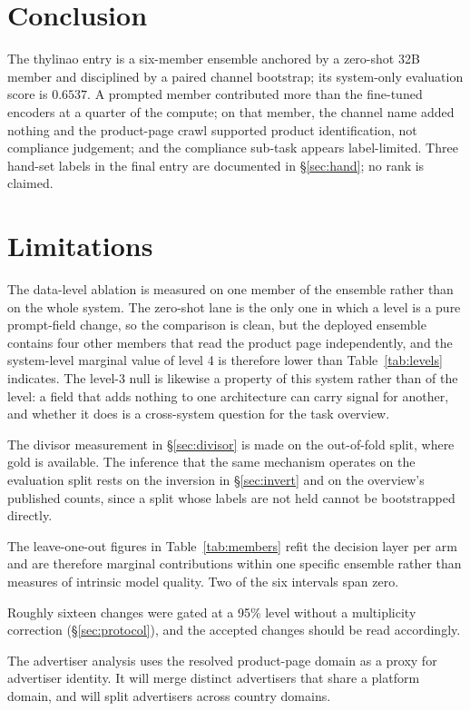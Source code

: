 \documentclass[11pt]{article}
\begin{document}
\section{Conclusion}

The thylinao entry is a six-member ensemble anchored by a zero-shot 32B member and disciplined
by a paired channel bootstrap; its system-only evaluation score is $0.6537$. A prompted member
contributed more than the fine-tuned encoders at a quarter of the compute; on that member, the
channel name added nothing and the product-page crawl supported product identification, not
compliance judgement; and the compliance sub-task appears label-limited. Three hand-set labels
in the final entry are documented in \S\ref{sec:hand}; no rank is claimed.

\section*{Limitations}

The data-level ablation is measured on one member of the ensemble rather than on the whole
system. The zero-shot lane is the only one in which a level is a pure prompt-field change, so the
comparison is clean, but the deployed ensemble contains four other members that read the product
page independently, and the system-level marginal value of level 4 is therefore lower than
Table~\ref{tab:levels} indicates. The level-3 null is likewise a property of this system rather
than of the level: a field that adds nothing to one architecture can carry signal for another,
and whether it does is a cross-system question for the task overview.

The divisor measurement in \S\ref{sec:divisor} is made on the out-of-fold split, where gold is
available. The inference that the same mechanism operates on the evaluation split rests on the
inversion in \S\ref{sec:invert} and on the overview's published counts, since a split whose
labels are not held cannot be bootstrapped directly.

The leave-one-out figures in Table~\ref{tab:members} refit the decision layer per arm and are
therefore marginal contributions within one specific ensemble rather than measures of intrinsic
model quality. Two of the six intervals span zero.

Roughly sixteen changes were gated at a 95\% level without a multiplicity correction
(\S\ref{sec:protocol}), and the accepted changes should be read accordingly.

The advertiser analysis uses the resolved product-page domain as a proxy for advertiser identity.
It will merge distinct advertisers that share a platform domain, and will split advertisers
across country domains.
\end{document}
